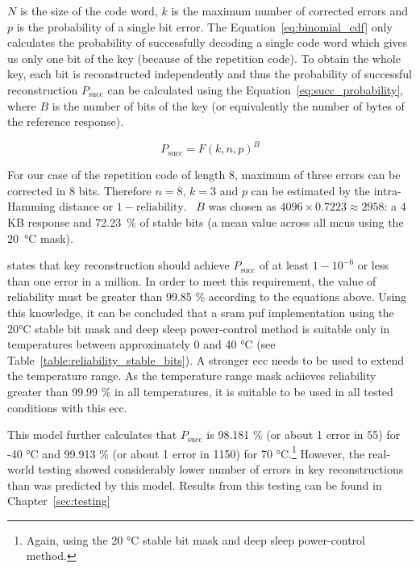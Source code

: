 $N$ is the size of the code word, $k$ is the maximum number of corrected errors and $p$ is the probability of a single bit error. The Equation~\ref{eq:binomial_cdf} only calculates the probability of successfully decoding a single code word which gives us only one bit of the key (because of the repetition code). To obtain the whole key, each bit is reconstructed independently and thus the probability of successful reconstruction $P_{\textrm{succ}}$ can be calculated using the Equation~\ref{eq:succ_probability}, where $B$ is the number of bits of the key (or equivalently the number of bytes of the reference response).

\begin{equation}\label{eq:succ_probability}
    P_{\textrm{succ}} = F(k, n, p)^{B} 
\end{equation}

For our case of the repetition code of length 8, maximum of three errors can be corrected in 8 bits. Therefore $n = 8$, $k = 3$ and $p$ can be estimated by the intra-Hamming distance or $1 - \textrm{reliability}$.~\cite{Iluminada2015} $B$ was chosen as $4096 \times 0.7223 \approx 2958$: a 4 KB response and 72.23~\% of stable bits (a mean value across all \glspl{mcu} using the 20~°C mask).

\cite{Bosch2008} states that key reconstruction should achieve $P_{\textrm{succ}}$ of at least $1 - 10^{-6}$ or less than one error in a million. In order to meet this requirement, the value of reliability must be greater than 99.85 \% according to the equations above. Using this knowledge, it can be concluded that a \gls{sram} \gls{puf} implementation using the 20°C stable bit mask and deep sleep power-control method is suitable only in temperatures between approximately 0 and 40 °C (see Table~\ref{table:reliability_stable_bits}). A stronger \gls{ecc} needs to be used to extend the temperature range. As the temperature range mask achieves reliability greater than 99.99 \% in all temperatures, it is suitable to be used in all tested conditions with this \gls{ecc}.

This model further calculates that $P_{\textrm{succ}}$ is 98.181 \% (or about 1 error in 55) for -40 °C and 99.913 \% (or about 1 error in 1150) for 70 °C.\footnote{Again, using the 20 °C stable bit mask and deep sleep power-control method.} However, the real-world testing showed considerably lower number of errors in key reconstructions than was predicted by this model. Results from this testing can be found in Chapter~\ref{sec:testing}

